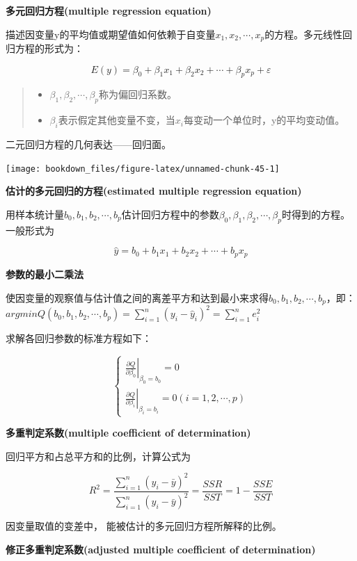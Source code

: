 \documentclass[]{ctexbook}
\providecommand{\tightlist}{%
  \setlength{\itemsep}{0pt}\setlength{\parskip}{0pt}}
\begin{document}
\textbf{多元回归方程(multiple regression equation)}

描述因变量y的平均值或期望值如何依赖于自变量\(x_1,x_2,\cdots,x_p\)的方程。多元线性回归方程的形式为：

\[E(y)=\beta_0+\beta_1x_1+\beta_2x_2+\cdots+\beta_px_p+\varepsilon\]

\begin{quote}
\begin{itemize}
\tightlist
\item
  \(\beta_1,\beta_2,\cdots,\beta_p\)称为偏回归系数。
\item
  \(\beta_i\)表示假定其他变量不变，当\(x_i\)每变动一个单位时，y的平均变动值。
\end{itemize}
\end{quote}

二元回归方程的几何表达------回归面。

\texttt{[image: bookdown\_files/figure-latex/unnamed-chunk-45-1]}

\textbf{估计的多元回归的方程(estimated multiple regression equation)}

用样本统计量\(b_0,b_1,b_2,\cdots,b_p\)估计回归方程中的参数\(\beta_0,\beta_1,\beta_2,\cdots,\beta_p\)时得到的方程。一般形式为

\[\hat y=b_0+b_1x_1+b_2x_2+\cdots+b_px_p\]

\textbf{参数的最小二乘法}

使因变量的观察值与估计值之间的离差平方和达到最小来求得\(b_0,b_1,b_2,\cdots,b_p\)，即：\(argmin Q(b_0,b_1,b_2,\cdots,b_p)=\sum_{i=1}^n(y_i-\hat y_i)^2=\sum_{i=1}^ne_i^2\)

求解各回归参数的标准方程如下：

\[\begin{cases}\left. \frac{\partial Q}{\partial \beta_0} \right| _{\beta_0=b_0}=0\\\left. \frac{\partial Q}{\partial \beta_i} \right| _{\beta_i=b_i}=0(i=1,2,\cdots,p)\end{cases}\]

\textbf{多重判定系数(multiple coefficient of determination)}

回归平方和占总平方和的比例，计算公式为

\[R^2=\frac{\sum_{i=1}^n(\hat y_i-\bar y)^2}{\sum_{i=1}^n(y_i-\bar y)^2}=\frac{SSR}{SST}=1-\frac{SSE}{SST}\]

因变量取值的变差中， 能被估计的多元回归方程所解释的比例。

\textbf{修正多重判定系数(adjusted multiple coefficient of determination)}
\end{document}
